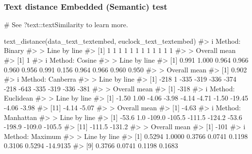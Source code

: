 \documentclass[
  12pt,
  a4paper,
  oneside]{tesesusp}
\newenvironment{Shaded}{\begin{snugshade}}{\end{snugshade}}
\newcommand{\CommentTok}[1]{\textcolor[rgb]{0.37,0.37,0.37}{#1}}
\newcommand{\FunctionTok}[1]{\textcolor[rgb]{0.28,0.35,0.67}{#1}}
\newcommand{\NormalTok}[1]{\textcolor[rgb]{0.00,0.23,0.31}{#1}}
\begin{document}
\hypertarget{text-distance-embedded-semantic-test}{%
\subsubsection{Text distance \textbar{} Embedded (Semantic)
test}\label{text-distance-embedded-semantic-test}}

\begin{Shaded}
\begin{Highlighting}[numbers=left,,]
\CommentTok{\# See \textasciigrave{}?text::textSimilarity\textasciigrave{} to learn more.}

\FunctionTok{text\_distance}\NormalTok{(data\_text\_textembed, euclock\_text\_textembed)}
\CommentTok{\#\textgreater{} i Method: Binary}
\CommentTok{\#\textgreater{} \textgreater{} Line by line}
\CommentTok{\#\textgreater{}  [1] 1 1 1 1 1 1 1 1 1 1 1 1}
\CommentTok{\#\textgreater{} \textgreater{} Overall mean}
\CommentTok{\#\textgreater{} [1] 1}
\CommentTok{\#\textgreater{} i Method: Cosine}
\CommentTok{\#\textgreater{} \textgreater{} Line by line}
\CommentTok{\#\textgreater{}  [1] 0.991 1.000 0.964 0.966 0.960 0.956 0.991 0.156 0.964 0.966 0.960 0.950}
\CommentTok{\#\textgreater{} \textgreater{} Overall mean}
\CommentTok{\#\textgreater{} [1] 0.902}
\CommentTok{\#\textgreater{} i Method: Canberra}
\CommentTok{\#\textgreater{} \textgreater{} Line by line}
\CommentTok{\#\textgreater{}  [1] {-}218    1 {-}335 {-}319 {-}336 {-}374 {-}218 {-}643 {-}335 {-}319 {-}336 {-}381}
\CommentTok{\#\textgreater{} \textgreater{} Overall mean}
\CommentTok{\#\textgreater{} [1] {-}318}
\CommentTok{\#\textgreater{} i Method: Euclidean}
\CommentTok{\#\textgreater{} \textgreater{} Line by line}
\CommentTok{\#\textgreater{}  [1]  {-}1.50   1.00  {-}4.06  {-}3.98  {-}4.14  {-}4.71  {-}1.50 {-}19.45  {-}4.06  {-}3.98}
\CommentTok{\#\textgreater{} [11]  {-}4.14  {-}5.07}
\CommentTok{\#\textgreater{} \textgreater{} Overall mean}
\CommentTok{\#\textgreater{} [1] {-}4.63}
\CommentTok{\#\textgreater{} i Method: Manhattan}
\CommentTok{\#\textgreater{} \textgreater{} Line by line}
\CommentTok{\#\textgreater{}  [1]  {-}53.6    1.0 {-}109.0 {-}105.5 {-}111.5 {-}124.2  {-}53.6 {-}198.9 {-}109.0 {-}105.5}
\CommentTok{\#\textgreater{} [11] {-}111.5 {-}131.2}
\CommentTok{\#\textgreater{} \textgreater{} Overall mean}
\CommentTok{\#\textgreater{} [1] {-}101}
\CommentTok{\#\textgreater{} i Method: Maximum}
\CommentTok{\#\textgreater{} \textgreater{} Line by line}
\CommentTok{\#\textgreater{}  [1]   0.5294   1.0000   0.3766   0.0741   0.1198   0.3106   0.5294 {-}14.9135}
\CommentTok{\#\textgreater{}  [9]   0.3766   0.0741   0.1198   0.1683}

\end{Highlighting}
\end{Shaded}
\end{document}
